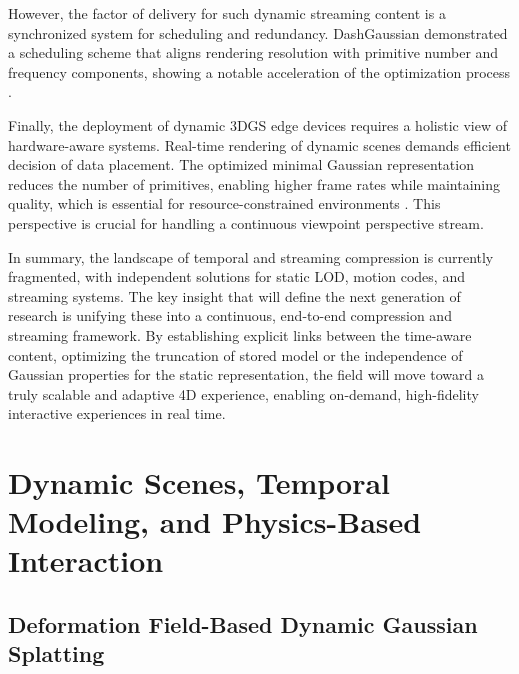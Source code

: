 \documentclass[11pt,a4paper]{article}
\begin{document}
However, the factor of delivery for such dynamic streaming content is a synchronized system for scheduling and redundancy. DashGaussian demonstrated a scheduling scheme that aligns rendering resolution with primitive number and frequency components, showing a notable acceleration of the optimization process \cite{arxiv:2503.18402v2}.

Finally, the deployment of dynamic 3DGS edge devices requires a holistic view of hardware-aware systems. Real-time rendering of dynamic scenes demands efficient decision of data placement. The optimized minimal Gaussian representation reduces the number of primitives, enabling higher frame rates while maintaining quality, which is essential for resource-constrained environments \cite{arxiv:2503.16924v2}. This perspective is crucial for handling a continuous viewpoint perspective stream.

In summary, the landscape of temporal and streaming compression is currently fragmented, with independent solutions for static LOD, motion codes, and streaming systems. The key insight that will define the next generation of research is unifying these into a continuous, end-to-end compression and streaming framework. By establishing explicit links between the time-aware content, optimizing the truncation of stored model or the independence of Gaussian properties for the static representation, the field will move toward a truly scalable and adaptive 4D experience, enabling on-demand, high-fidelity interactive experiences in real time.


\section{Dynamic Scenes, Temporal Modeling, and Physics-Based Interaction}



\subsection{Deformation Field-Based Dynamic Gaussian Splatting}
\end{document}
